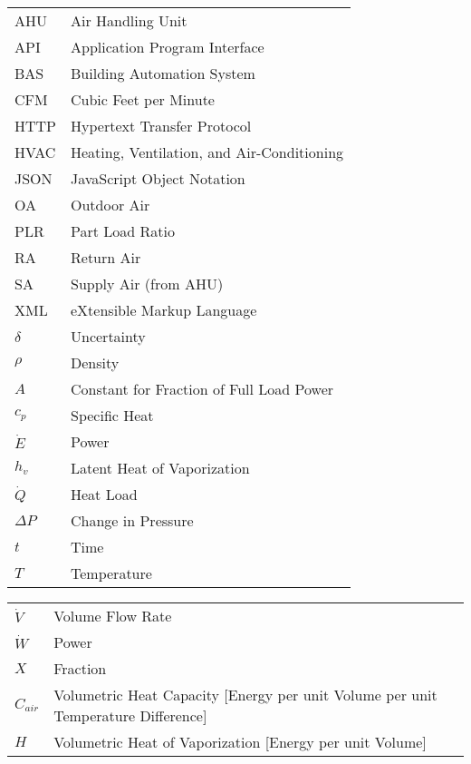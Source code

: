 \begin{tabular}{ll}
AHU          & Air Handling Unit\tabularnewline
API          & Application Program Interface                             \\
BAS          & Building Automation System\tabularnewline
CFM          & Cubic Feet per Minute                                     \\
HTTP         & Hypertext Transfer Protocol                               \\
HVAC         & Heating, Ventilation, and Air-Conditioning\tabularnewline
JSON         & JavaScript Object Notation                                \\
OA           & Outdoor Air                                               \\
PLR          & Part Load Ratio                                           \\
RA           & Return Air                                                \\
SA           & Supply Air (from AHU)                                     \\
XML          & eXtensible Markup Language                                \\
\(\delta\)   & Uncertainty                                               \\
\(\rho\)     & Density                                                   \\
\(A\)        & Constant for Fraction of Full Load Power                  \\
\(c_{p}\)    & Specific Heat                                             \\
\(\dot{E}\)  & Power                                                     \\
\(h_{v}\)    & Latent Heat of Vaporization                               \\
\( \dot{Q}\) & Heat Load                                                 \\
\(\Delta P\) & Change in Pressure                                        \\
\(t\)        & Time\tabularnewline
\(T\)        & Temperature\tabularnewline
\end{tabular}

\begin{tabular}{ll}
\(\dot{V}\) & Volume Flow Rate                                                                  \\
\(\dot{W}\) & Power                                                                             \\
\(X\)       & Fraction                                                                          \\
\(C_{air}\) & \parbox[t]{5in}{Volumetric Heat Capacity [Energy per unit Volume per unit Temperature Difference] } \\
\(H\)       & Volumetric Heat of Vaporization [Energy per unit Volume]                          \\
\end{tabular}


